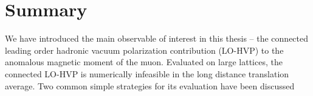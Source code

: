 



\section{Summary}
\label{sec:2pt:summary}


We have introduced the main observable of interest in this thesis -- the connected leading order hadronic vacuum polarization contribution (LO-HVP) to the anomalous magnetic moment of the muon.
Evaluated on large lattices, the connected LO-HVP is numerically infeasible in the long distance translation average.
Two common simple strategies for its evaluation have been discussed

